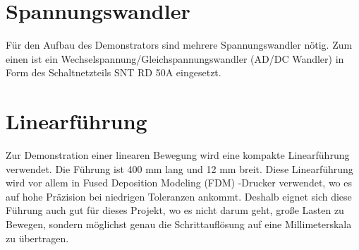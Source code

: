 \section{Spannungswandler}
Für den Aufbau des Demonstrators sind mehrere Spannungswandler nötig. Zum einen ist ein Wechselspannung/Gleichspannungswandler (AD/DC Wandler) in Form des Schaltnetzteils SNT RD 50A eingesetzt. 

\section{Linearführung}
Zur Demonstration einer linearen Bewegung wird eine kompakte Linearführung verwendet. Die Führung ist 400 mm lang und 12 mm breit. Diese Linearführung wird vor allem in Fused Deposition Modeling (FDM) -Drucker verwendet, wo es auf hohe Präzision bei niedrigen Toleranzen ankommt. Deshalb eignet sich diese Führung auch gut für dieses Projekt, wo es nicht darum geht, große Lasten zu Bewegen, sondern möglichst genau die Schrittauflösung auf eine Millimeterskala zu übertragen.

